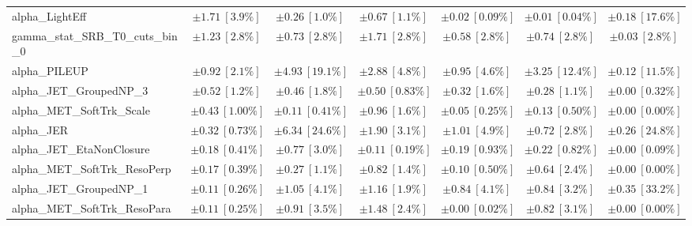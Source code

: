 \begin{sidewaystable}
\begin{center}
\begin{tabular*}{\textwidth}{@{\extracolsep{\fill}}lcccccc}
alpha\_LightEff         & $\pm 1.71\ [3.9\%] $          & $\pm 0.26\ [1.0\%] $          & $\pm 0.67\ [1.1\%] $          & $\pm 0.02\ [0.09\%] $          & $\pm 0.01\ [0.04\%] $          & $\pm 0.18\ [17.6\%] $       \\
gamma\_stat\_SRB\_T0\_cuts\_bin\_0         & $\pm 1.23\ [2.8\%] $          & $\pm 0.73\ [2.8\%] $          & $\pm 1.71\ [2.8\%] $          & $\pm 0.58\ [2.8\%] $          & $\pm 0.74\ [2.8\%] $          & $\pm 0.03\ [2.8\%] $       \\
alpha\_PILEUP         & $\pm 0.92\ [2.1\%] $          & $\pm 4.93\ [19.1\%] $          & $\pm 2.88\ [4.8\%] $          & $\pm 0.95\ [4.6\%] $          & $\pm 3.25\ [12.4\%] $          & $\pm 0.12\ [11.5\%] $       \\
alpha\_JET\_GroupedNP\_3         & $\pm 0.52\ [1.2\%] $          & $\pm 0.46\ [1.8\%] $          & $\pm 0.50\ [0.83\%] $          & $\pm 0.32\ [1.6\%] $          & $\pm 0.28\ [1.1\%] $          & $\pm 0.00\ [0.32\%] $       \\
alpha\_MET\_SoftTrk\_Scale         & $\pm 0.43\ [1.00\%] $          & $\pm 0.11\ [0.41\%] $          & $\pm 0.96\ [1.6\%] $          & $\pm 0.05\ [0.25\%] $          & $\pm 0.13\ [0.50\%] $          & $\pm 0.00\ [0.00\%] $       \\
alpha\_JER         & $\pm 0.32\ [0.73\%] $          & $\pm 6.34\ [24.6\%] $          & $\pm 1.90\ [3.1\%] $          & $\pm 1.01\ [4.9\%] $          & $\pm 0.72\ [2.8\%] $          & $\pm 0.26\ [24.8\%] $       \\
alpha\_JET\_EtaNonClosure         & $\pm 0.18\ [0.41\%] $          & $\pm 0.77\ [3.0\%] $          & $\pm 0.11\ [0.19\%] $          & $\pm 0.19\ [0.93\%] $          & $\pm 0.22\ [0.82\%] $          & $\pm 0.00\ [0.09\%] $       \\
alpha\_MET\_SoftTrk\_ResoPerp         & $\pm 0.17\ [0.39\%] $          & $\pm 0.27\ [1.1\%] $          & $\pm 0.82\ [1.4\%] $          & $\pm 0.10\ [0.50\%] $          & $\pm 0.64\ [2.4\%] $          & $\pm 0.00\ [0.00\%] $       \\
alpha\_JET\_GroupedNP\_1         & $\pm 0.11\ [0.26\%] $          & $\pm 1.05\ [4.1\%] $          & $\pm 1.16\ [1.9\%] $          & $\pm 0.84\ [4.1\%] $          & $\pm 0.84\ [3.2\%] $          & $\pm 0.35\ [33.2\%] $       \\
alpha\_MET\_SoftTrk\_ResoPara         & $\pm 0.11\ [0.25\%] $          & $\pm 0.91\ [3.5\%] $          & $\pm 1.48\ [2.4\%] $          & $\pm 0.00\ [0.02\%] $          & $\pm 0.82\ [3.1\%] $          & $\pm 0.00\ [0.00\%] $       \\

\end{tabular*}
\end{center}
\end{sidewaystable}
